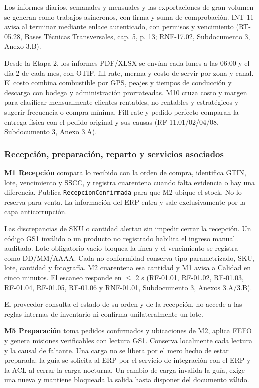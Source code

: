 Los informes diarios, semanales y mensuales y las exportaciones de gran volumen se generan como trabajos asíncronos, con firma y suma de comprobación. INT-11 avisa al terminar mediante enlace autenticado, con permisos y vencimiento (RT-05.28, Bases Técnicas Transversales, cap. 5, p. 13; RNF-17.02, Subdocumento 3, Anexo 3.B).

Desde la Etapa 2, los informes PDF/XLSX se envían cada lunes a las 06:00 y el día 2 de cada mes, con OTIF, fill rate, merma y costo de servir por zona y canal. El costo combina combustible por GPS, peajes y tiempos de conducción y descarga con bodega y administración prorrateadas. M10 cruza costo y margen para clasificar mensualmente clientes rentables, no rentables y estratégicos y sugerir frecuencia o compra mínima. Fill rate y pedido perfecto comparan la entrega física con el pedido original y sus causas (RF-11.01/02/04/08, Subdocumento 3, Anexo 3.A).

\subsubsection{Recepción, preparación, reparto y servicios asociados}
\label{subsec:modulos-operativos}

\textbf{M1 Recepción} compara lo recibido con la orden de compra, identifica GTIN, lote, vencimiento y SSCC, y registra cuarentena cuando falta evidencia o hay una diferencia. Publica \texttt{RecepcionConfirmada} para que M2 ubique el stock. No lo reserva para venta. La información del ERP entra y sale exclusivamente por la capa anticorrupción.

Las discrepancias de SKU o cantidad alertan sin impedir cerrar la recepción. Un código GS1 inválido o un producto no registrado habilita el ingreso manual auditado. Lote obligatorio vacío bloquea la línea y el vencimiento se registra como DD/MM/AAAA. Cada no conformidad conserva tipo parametrizado, SKU, lote, cantidad y fotografía. M2 cuarentena esa cantidad y M1 avisa a Calidad en cinco minutos. El escaneo responde en $\leq$ 2 s (RF-01.01, RF-01.02, RF-01.03, RF-01.04, RF-01.05, RF-01.06 y RNF-01.01, Subdocumento 3, Anexos 3.A/3.B).

El proveedor consulta el estado de su orden y de la recepción, no accede a las reglas internas de inventario ni confirma unilateralmente un lote.

\textbf{M5 Preparación} toma pedidos confirmados y ubicaciones de M2, aplica FEFO y genera misiones verificables con lectura GS1. Conserva localmente cada lectura y la causal de faltante. Una carga no se libera por el mero hecho de estar preparada: la guía se solicita al ERP por el servicio de integración con el ERP y la ACL al cerrar la carga nocturna. Un cambio de carga invalida la guía, exige una nueva y mantiene bloqueada la salida hasta disponer del documento válido.

